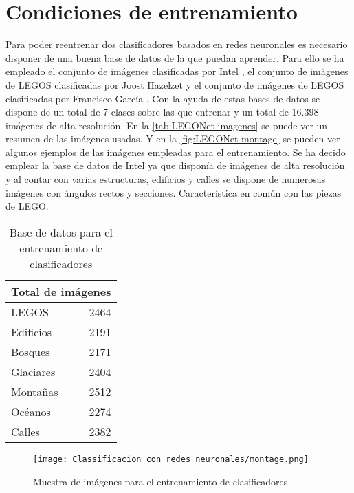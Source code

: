 \section{Condiciones de entrenamiento}
\label{sec:Condiciones de entrenamiento}
Para poder reentrenar dos clasificadores basados en redes neuronales es necesario disponer de una buena base de datos de la que puedan aprender. Para ello se ha empleado el conjunto de imágenes clasificadas por Intel \citep{IntelDataset}, el conjunto de imágenes de LEGOS clasificadas por Joost Hazelzet \citep{LEGODataset} y el conjunto de imágenes de LEGOS clasificadas por Francisco García \citep{LEGODataset2}. Con la ayuda de estas bases de datos se dispone de un total de 7 clases sobre las que entrenar y un total de 16.398 imágenes de alta resolución. En la \autoref{tab:LEGONet imagenes} se puede ver un resumen de las imágenes usadas. Y en la \autoref{fig:LEGONet montage} se pueden ver algunos ejemplos de las imágenes empleadas para el entrenamiento. Se ha decido emplear la base de datos de Intel ya que disponía de imágenes de alta resolución y al contar con varias estructuras, edificios y calles se dispone de numerosas imágenes con ángulos rectos y secciones. Característica en común con las piezas de LEGO. 

\begin{table}[ht]
  \centering
    \begin{tabular}{|l|r|}
    \hline
    \multicolumn{2}{|c|}{Total de imágenes}\\
    \hline
    LEGOS & 2464 \\
    \hline
    Edificios & 2191 \\
    \hline
    Bosques & 2171 \\
    \hline
    Glaciares & 2404 \\
    \hline
    Montañas & 2512 \\
    \hline
    Océanos & 2274 \\
    \hline
    Calles & 2382 \\
    \hline
    \end{tabular}%
    \caption{Base de datos para el entrenamiento de clasificadores}
  \label{tab:LEGONet imagenes}%
\end{table}%

\begin{figure}[ht]  %
	\centering
	\texttt{[image: Classificacion con redes neuronales/montage.png]}
	\caption{Muestra de imágenes para el entrenamiento de clasificadores}
	\label{fig:LEGONet montage}
\end{figure}

